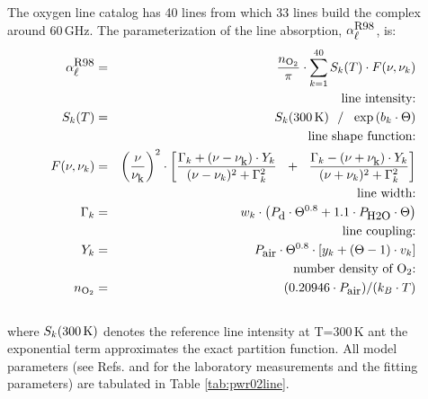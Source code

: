 The oxygen line catalog has 40 lines from which 33 lines build the 
complex around 60\,GHz. The parameterization of the line absorption,
$\alpha^{\mbox{\rm \small R98}}_{\mbox{\small $\ell$}}$, is:
\begin{eqnarray}
  \alphapwrl & = & \frac{n_{\rm O_2}}{\pi} \cdot 
                   \sum_{k=1}^{40}{S_k(T) \cdot F(\nu,\nu_k)}\\
%
%
 & & \mbox{line intensity:} \nonumber\\
      \label{eq:abs_theory:PWR93:O2_abs_inten}
      S_k(T) & = & S_k(300\,{\rm K})~~/~~\exp{(b_k \cdot \Theta)}\\
 & & \mbox{line shape function:} \nonumber\\
   F(\nu,\nu_k) & = & \left(\frac{\nu}{\nuk}\right)^2 \cdot 
                   \left[\frac{\Gamma_k+(\nu-\nuk)\cdot Y_k}
                              {(\nu-\nu_k)^2+\Gamma_k^2}~~+~~
                         \frac{\Gamma_k-(\nu+\nuk)\cdot Y_k}
                              {(\nu+\nu_k)^2+\Gamma_k^2}\right] \nonumber\\
 & & \mbox{line width:} \nonumber\\
    \label{eq:abs_theory:PWR93:O2_gamma}
    \Gamma_k & = & w_k \cdot \left(          \pda  \cdot \Theta^{0.8} + 
                                   1.1 \cdot \phzo \cdot \Theta \right)\\
 & & \mbox{line coupling:} \nonumber\\
         \label{eq:abs_theory:PWR93:O2_coupling}
         Y_k & = & \pdair \cdot \Theta^{0.8} \cdot 
                   \left[ y_k + (\Theta-1) \cdot v_k \right]\nonumber\\
 & & \mbox{number density of $\oz$:} \nonumber\\
           n_{\rm O_2} & = & (0.20946 \cdot \pdair)/(k_B \cdot T)\nonumber\\
           \nonumber
\end{eqnarray}
where $S_k(300\,{\rm K})$ denotes the reference line
intensity at T=300\,K ant the exponential term approximates the exact 
partition function. All model parameters (see Refs. \citet{pwr:93} and \citet{liebeetal:92}
for the laboratory measurements and the fitting parameters) are 
tabulated in Table \ref{tab:pwr02line}.
%
